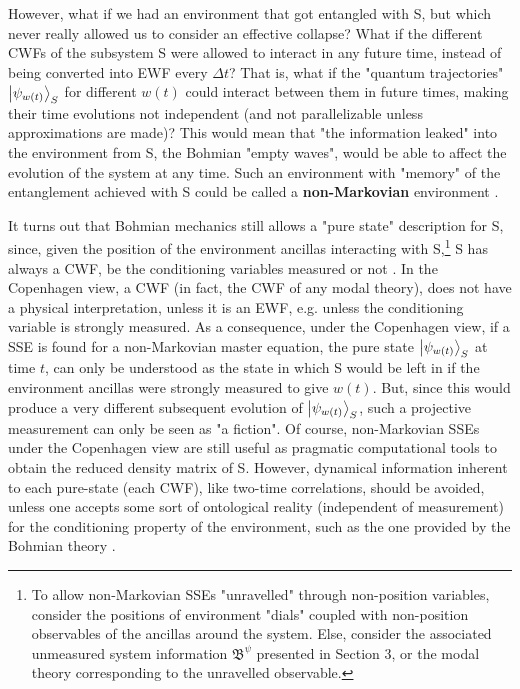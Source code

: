 \documentclass[11pt, a4paper]{article} %
\newcommand{\B}{\mathfrak{B}}
\begin{document}
However, what if we had an environment that got entangled with S, but which never really allowed us to consider an effective collapse? What if the different CWFs of the subsystem S were allowed to interact in any future time, instead of being converted into EWF every $\Delta t$? That is, what if the "quantum trajectories" $\ket{\psi_{w(t)}}_S$ for different $w(t)$ could interact between them in future times, making their time evolutions not independent (and not parallelizable unless approximations are made)? This would mean that "the information leaked" into the environment from S, the Bohmian "empty waves", would be able to affect the evolution of the system at any time. Such an environment with "memory" of the entanglement achieved with S could be called a {\bf non-Markovian} environment \cite{MarkovianityDefs}. 

It turns out that Bohmian mechanics still allows a "pure state" description for S, since, given the position of the environment ancillas interacting with S,\footnote{To allow non-Markovian SSEs "unravelled" through non-position variables, consider the positions of environment "dials" coupled with non-position observables of the ancillas around the system. Else, consider the associated unmeasured system information $\B^\psi$ presented in Section 3, or the modal theory corresponding to the unravelled observable.} S has always a CWF, be the conditioning variables measured or not \cite{NMisModal, interpretSSE}. In the Copenhagen view, a CWF (in fact, the CWF of any modal theory), does not have a physical interpretation, unless it is an EWF, e.g. unless the conditioning variable is strongly measured. As a consequence, under the Copenhagen view, if a SSE is found for a non-Markovian master equation, the pure state $\ket{\psi_{w(t)}}_S$ at time $t$, can only be understood as the state in which S would be left in if the environment ancillas were strongly measured to give $w(t)$. But, since this would produce a very different subsequent evolution of $\ket{\psi_{w(t)}}_S$, such a projective measurement can only be seen as "a fiction". Of course, non-Markovian SSEs under the Copenhagen view are still useful as pragmatic computational tools to obtain the reduced density matrix of S. However, dynamical information inherent to each pure-state (each CWF), like two-time correlations, should be avoided, unless one accepts some sort of ontological reality (independent of measurement) for the conditioning property of the environment, such as the one provided by the Bohmian theory \cite{NMisModal, interpretSSE}.
\end{document}
